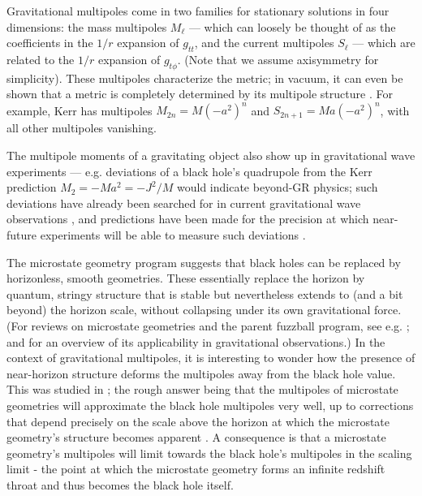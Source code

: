 \documentclass[12pt,a4paper]{article}
\begin{document}
Gravitational multipoles come in two families for stationary solutions in four dimensions: the mass multipoles $M_\ell$ --- which can loosely be thought of as the coefficients in the $1/r$ expansion of $g_{tt}$, and the current multipoles $S_\ell$ --- which are related to the $1/r$ expansion of $g_{t\phi}$. (Note that we assume axisymmetry for simplicity). These multipoles characterize the metric; in vacuum, it can even be shown that a metric is completely determined by its multipole structure \cite{beig1980proof,kundu1981multipole,kundu1981analyticity}. For example, Kerr has multipoles $M_{2n} = M(-a^2)^n$ and $S_{2n+1} = Ma(-a^2)^n$, with all other multipoles vanishing.

The multipole moments of a gravitating object also show up in gravitational wave experiments --- e.g. deviations of a black hole's quadrupole from the Kerr  prediction $M_2 = -Ma^2 = -J^2 /M$ would indicate beyond-GR physics; such deviations have already been searched for in current gravitational wave observations \cite{Krishnendu:2017shb,LIGOScientific:2021sio}, and predictions have been made for the precision at which near-future experiments will be able to measure such deviations \cite{Krishnendu:2018nqa,Barack:2006pq,Gair:2017ynp,Fransen:2022jtw,Cano:2022wwo}.

The microstate geometry program suggests that black holes can be replaced by horizonless, smooth geometries. These essentially replace the horizon by quantum, stringy structure that is stable but nevertheless extends to (and a bit beyond) the horizon scale, without collapsing under its own gravitational force. (For reviews on microstate geometries and the parent fuzzball program, see e.g. \cite{Mathur:2005zp,Bena:2007kg,Bena:2013dka,Warner:2019jll,Shigemori:2020yuo}; and \cite{Mayerson:2020tpn,Mayerson:2022yoc} for an overview of its applicability in gravitational observations.) In the context of gravitational multipoles, it is interesting to wonder how the presence of near-horizon structure deforms the multipoles away from the black hole value. This was studied in \cite{Bena:2020see,Bena:2020uup,Bianchi:2020bxa,Bianchi:2020miz,Bah:2021jno}; the rough answer being that the multipoles of microstate geometries will approximate the black hole multipoles very well, up to corrections that depend precisely on the scale above the horizon at which the microstate geometry's structure becomes apparent \cite{Bah:2021jno}. A consequence is that a microstate geometry's multipoles will limit towards the black hole's multipoles in the scaling limit - the point at which the microstate geometry forms an infinite redshift throat and thus becomes the black hole itself.
\end{document}
